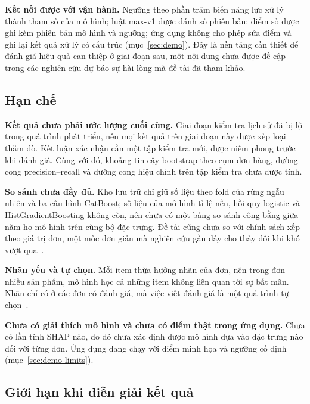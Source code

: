 \documentclass[12pt,a4paper]{report}
\begin{document}
\textbf{Kết nối được với vận hành.} Ngưỡng theo phần trăm biến năng lực xử lý thành tham số của mô hình; luật max-v1 được đánh số phiên bản; điểm số được ghi kèm phiên bản mô hình và ngưỡng; ứng dụng không cho phép sửa điểm và ghi lại kết quả xử lý có cấu trúc (mục~\ref{sec:demo}). Đây là nền tảng cần thiết để đánh giá hiệu quả can thiệp ở giai đoạn sau, một nội dung chưa được đề cập trong các nghiên cứu dự báo sự hài lòng mà đề tài đã tham khảo.

\subsection{Hạn chế}

\textbf{Kết quả chưa phải ước lượng cuối cùng.} Giai đoạn kiểm tra lịch sử đã bị lộ trong quá trình phát triển, nên mọi kết quả trên giai đoạn này được xếp loại thăm dò. Kết luận xác nhận cần một tập kiểm tra mới, được niêm phong trước khi đánh giá. Cùng với đó, khoảng tin cậy bootstrap theo cụm đơn hàng, đường cong precision--recall và đường cong hiệu chỉnh trên tập kiểm tra chưa được tính.

\textbf{So sánh chưa đầy đủ.} Kho lưu trữ chỉ giữ số liệu theo fold của rừng ngẫu nhiên và ba cấu hình CatBoost; số liệu của mô hình tỉ lệ nền, hồi quy logistic và HistGradientBoosting không còn, nên chưa có một bảng so sánh công bằng giữa năm họ mô hình trên cùng bộ đặc trưng. Đề tài cũng chưa so với chính sách xếp theo giá trị đơn, một mốc đơn giản mà nghiên cứu gần đây cho thấy đôi khi khó vượt qua~\cite{li2026valuesorting}.

\textbf{Nhãn yếu và tự chọn.} Mỗi item thừa hưởng nhãn của đơn, nên trong đơn nhiều sản phẩm, mô hình học cả những item không liên quan tới sự bất mãn. Nhãn chỉ có ở các đơn có đánh giá, mà việc viết đánh giá là một quá trình tự chọn~\cite{li2008}.

\textbf{Chưa có giải thích mô hình và chưa có điểm thật trong ứng dụng.} Chưa có lần tính SHAP nào, do đó chưa xác định được mô hình dựa vào đặc trưng nào đối với từng đơn. Ứng dụng đang chạy với điểm minh họa và ngưỡng cố định (mục~\ref{sec:demo-limits}).

\subsection{Giới hạn khi diễn giải kết quả}
\end{document}
